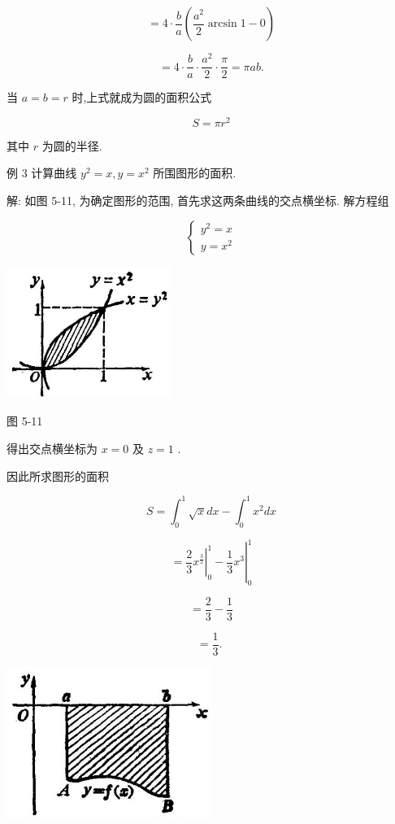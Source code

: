 \documentclass[lang=cn,newtx,10pt,scheme=chinese]{elegantbook}
\begin{document}
\[
= 4 \cdot \frac{b}{a}\left( {\frac{{a}^{2}}{2}\arcsin 1 - 0}\right)
\]

\[
= 4 \cdot \frac{b}{a} \cdot \frac{{a}^{2}}{2} \cdot \frac{\pi }{2} = {\pi ab}.
\]

当 \(a = b = r\) 时,上式就成为圆的面积公式

\[
S = \pi {r}^{2}
\]

其中 \(r\) 为圆的半径.

例 3 计算曲线 \({y}^{2} = x,y = {x}^{2}\) 所围图形的面积.

解: 如图 5-11, 为确定图形的范围, 首先求这两条曲线的交点横坐标. 解方程组

\[
\left\{ \begin{array}{l} {y}^{2} = x \\ y = {x}^{2} \end{array}\right.
\]

\begin{center}
\includegraphics[max width=0.4\textwidth]{images/01912c18-5c3f-733d-b775-749ba9897a9d_234_594804.jpg}
\end{center}

图 5-11

得出交点横坐标为 \(x = 0\) 及 \(z = 1\) .

因此所求图形的面积

\[
S = {\int }_{0}^{1}\sqrt{x}{dx} - {\int }_{0}^{1}{x}^{2}{dx}
\]

\[
= {\left. {\left. \frac{2}{3}{x}^{\frac{3}{2}}\right| }_{0}^{1} - \frac{1}{3}{x}^{3}\right| }_{0}^{1}
\]

\[
= \frac{2}{3} - \frac{1}{3}
\]

\[
= \frac{1}{3}\text{. }
\]

\begin{center}
\includegraphics[max width=0.5\textwidth]{images/01912c18-5c3f-733d-b775-749ba9897a9d_234_549966.jpg}
\end{center}
\end{document}
